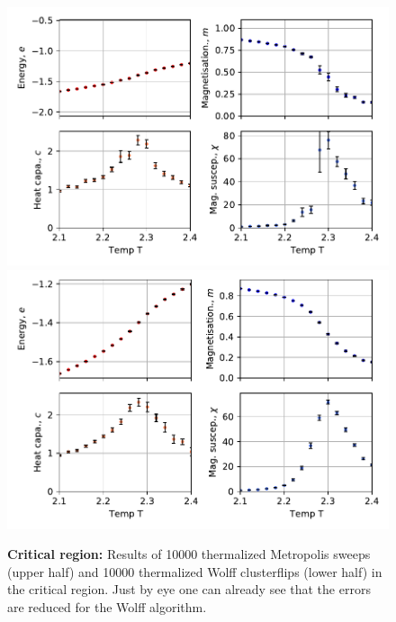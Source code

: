 \documentclass[11pt, a4paper]{scrartcl}
\begin{document}
    \begin{figure}
    \begin{centering}
        \includegraphics{obs_metro_critical.pdf}
        \includegraphics{obs_wolff_critical.pdf}
        \label{obs_critical}
        \caption{\textbf{Critical region: } Results of 10000 thermalized Metropolis sweeps (upper half) and 10000 thermalized Wolff clusterflips (lower half) in the critical region. Just by eye one can already see that the errors are reduced for the Wolff algorithm.}
    \end{centering}
    \end{figure}
\end{document}
